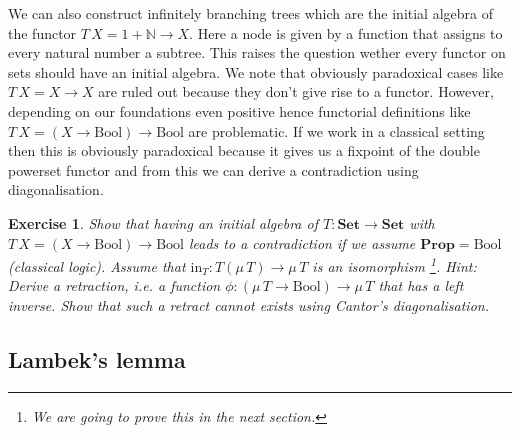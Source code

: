 \documentclass{article}
\newcommand{\Prop}{\mathbf{Prop}}
\newcommand{\Set}{\mathbf{Set}}
\newcommand{\Bool}{\mathrm{Bool}}
\newcommand{\Nat}{\mathbb{N}}
\newcommand{\inn}{\mathrm{in}}
\newtheorem{exercise}{Exercise}
\begin{document}
We can also construct infinitely branching trees which are the initial algebra of the functor $T\,X = 1 + \Nat \to X$. Here a node is given by a function that assigns to every natural number a subtree. This raises the question wether every functor on sets should have an initial algebra. We note that obviously paradoxical cases like $T\,X = X \to X$ are ruled out because they don't give rise to a functor. However, depending on our foundations even positive hence functorial definitions like $T\,X = (X \to \Bool) \to \Bool$ are problematic. If we work in a classical setting then this is obviously paradoxical because it gives us a fixpoint of the double powerset functor and from this we can derive a contradiction using diagonalisation.
\begin{exercise}
Show that having an initial algebra of $T : \Set \to \Set$ with $T\,X = (X \to \Bool) \to \Bool$ leads to a contradiction if we assume $\Prop = \Bool$ (classical logic). Assume that $\inn_T : T (\mu\,T) \to \mu\,T$ is an isomorphism
\footnote{We are going to prove this in the next section.}.
\emph{Hint:} Derive a retraction, i.e. a function $\phi : (\mu\,T \to \Bool) \to \mu\,T$ that has a left inverse. Show that such a retract cannot exists using Cantor's diagonalisation.
\end{exercise}

\subsection{Lambek's lemma}
\label{sec:lambeks-lemma}
\end{document}
